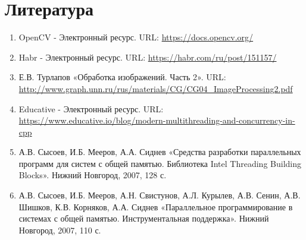 \documentclass{report}
\begin{document}
\section*{Литература}
\begin{enumerate}
\item OpenCV - Электронный ресурс. URL: \newline \url{https://docs.opencv.org/}
\item Habr - Электронный ресурс. URL: \newline \url{https://habr.com/ru/post/151157/}
\item Е.В. Турлапов «Обработка изображений. Часть 2». URL: \newline \url{http://www.graph.unn.ru/rus/materials/CG/CG04_ImageProcessing2.pdf}
\item Educative - Электронный ресурс. URL: \newline \url{https://www.educative.io/blog/modern-multithreading-and-concurrency-in-cpp}
\item А.В. Сысоев, И.Б. Мееров, А.А. Сиднев «Средства разработки параллельных программ для систем с общей памятью. Библиотека Intel Threading Building Blocks». Нижний Новгород, 2007, 128 с. 
\item А.В. Сысоев, И.Б. Мееров, А.Н. Свистунов, А.Л. Курылев, А.В. Сенин, А.В. Шишков, К.В. Корняков, А.А. Сиднев «Параллельное программирование в системах с общей
памятью. Инструментальная поддержка». Нижний Новгород, 2007, 110 с. 
\end{enumerate} 
\newpage

\end{document}
